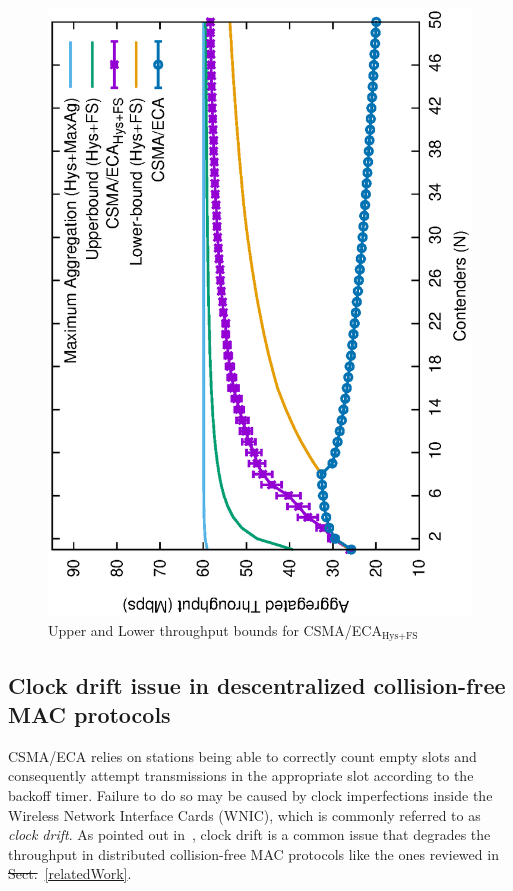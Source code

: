 \documentclass[a4paper,journal]{IEEEtran}
\providecommand{\DIFaddtex}[1]{{\protect\color{blue}\uwave{#1}}} %
\providecommand{\DIFdeltex}[1]{{\protect\color{red}\sout{#1}}}                      %
\providecommand{\DIFaddbegin}{} %
\providecommand{\DIFaddend}{} %
\providecommand{\DIFdelbegin}{} %
\providecommand{\DIFdelend}{} %
\providecommand{\DIFaddbeginFL}{} %
\providecommand{\DIFaddendFL}{} %
\providecommand{\DIFdelbeginFL}{} %
\providecommand{\DIFdelendFL}{} %
\providecommand{\DIFadd}[1]{\texorpdfstring{\DIFaddtex{#1}}{#1}} %
\providecommand{\DIFdel}[1]{\texorpdfstring{\DIFdeltex{#1}}{}} %
\begin{document}
	\begin{figure}[tb]
	\centering
		\DIFdelbeginFL %
\DIFdelendFL \DIFaddbeginFL \includegraphics[width=0.7\linewidth,angle=-90]{figures/throughput-w-model/throughput-combined-w-model-TON.eps}
		\DIFaddendFL \caption{Upper and Lower throughput bounds for CSMA/ECA$_{\text{Hys+FS}}$}
		\label{fig:ECA-bounds-comparison}
	\end{figure}

	\subsection{Clock drift issue in descentralized collision-free MAC protocols}\label{clockDrift-issue}
	CSMA/ECA relies on stations being able to correctly count empty slots and consequently attempt transmissions in the appropriate slot according to the backoff timer. Failure to do so may be caused by clock imperfections inside the Wireless Network Interface Cards (WNIC), which is commonly referred to as \emph{clock drift}. As pointed out in~\cite{slotDrift}, clock drift is a common issue that degrades the throughput in distributed collision-free MAC protocols like the ones reviewed in \DIFdelbegin \DIFdel{Sect.}\DIFdelend \DIFaddbegin \DIFadd{Section}\DIFaddend ~\ref{relatedWork}.
\end{document}
